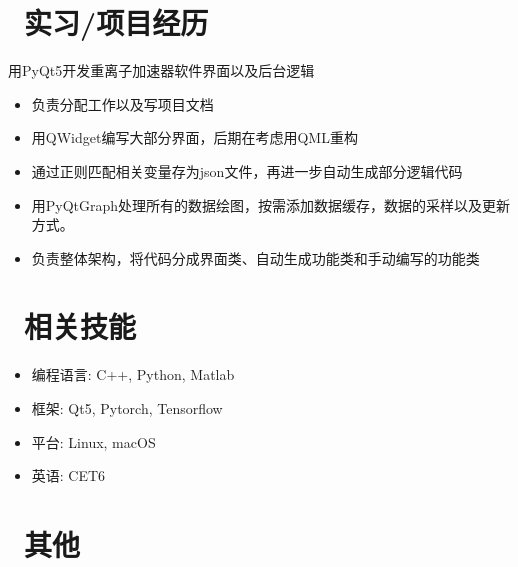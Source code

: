 \documentclass{resume}
\begin{document}
\section{\faUsers\ 实习/项目经历}
\begin{onehalfspacing}
用PyQt5开发重离子加速器软件界面以及后台逻辑
\begin{itemize}
  \item 负责分配工作以及写项目文档
  \item 用QWidget编写大部分界面，后期在考虑用QML重构
  \item 通过正则匹配相关变量存为json文件，再进一步自动生成部分逻辑代码
  \item 用PyQtGraph处理所有的数据绘图，按需添加数据缓存，数据的采样以及更新方式。
  \item 负责整体架构，将代码分成界面类、自动生成功能类和手动编写的功能类
\end{itemize}
\end{onehalfspacing}


\section{\faCogs\ 相关技能}
\begin{itemize}[parsep=0.5ex]
  \item 编程语言: C++, Python, Matlab
  \item 框架: Qt5, Pytorch, Tensorflow
  \item 平台: Linux, macOS
  \item 英语: CET6
\end{itemize}

\section{\faInfo\ 其他}

%
%
\end{document}
